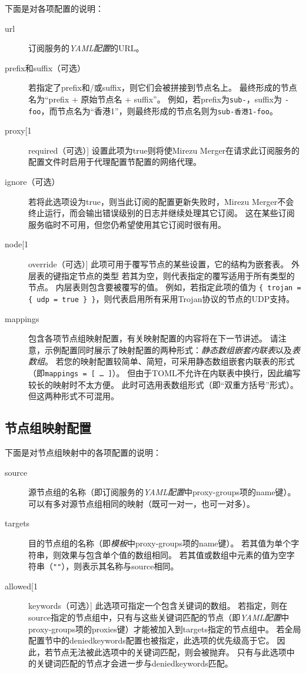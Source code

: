 \documentclass[a4paper,fontset=founder,punct=kaiming]{ctexart}
\renewcommand\_{\textunderscore\linebreak[1]}
\newcommand{\productname}{Mirezu Merger}
\begin{document}
下面是对各项配置的说明：
\begin{description}
\item[url] 订阅服务的\emph{YAML配置}的URL。
\item[prefix和suffix（可选）] 若指定了prefix和/或suffix，则它们会被拼接到节点名上。
  最终形成的节点名为“prefix + 原始节点名 + suffix”。
  例如，若prefix为\texttt{sub-}，suffix为 \texttt{-foo}，而节点名为“香港1”，则最终形成的节点名则为\texttt{sub-香港1-foo}。
\item[proxy\_required（可选）] 设置此项为true则将使\productname 在请求此订阅服务的配置文件时启用于代理配置节配置的网络代理。
\item[ignore（可选）] 若将此选项设为true，则当此订阅的配置更新失败时，\productname 不会终止运行，而会输出错误级别的日志并继续处理其它订阅。
这在某些订阅服务临时不可用，但您仍希望使用其它订阅时很有用。
\item[node\_override（可选）] 此项可用于覆写节点的某些设置，它的结构为嵌套表。
  外层表的键指定节点的类型
  若其为空，则代表指定的覆写适用于所有类型的节点。
  内层表则包含要被覆写的值。
  例如，若指定此项的值为 \Verb|{ trojan = { udp = true } }|，则代表启用所有采用Trojan协议的节点的UDP支持。
\item[mappings] 包含各项节点组映射配置，有关映射配置的内容将在下一节讲述。
  请注意，示例配置同时展示了映射配置的两种形式：\emph{静态数组嵌套内联表}以及\emph{表数组}。
  若您的映射配置较简单、简短，可采用静态数组嵌套内联表的形式（即\texttt{mappings = [ \ldots{} ]}）。
  但由于TOML不允许在内联表中换行，因此编写较长的映射时不太方便。
  此时可选用表数组形式（即“双重方括号”形式）。
  但这两种形式不可混用。
\end{description}

\subsection{节点组映射配置}
\label{sec:groupmap}

下面是对节点组映射中的各项配置的说明：
\begin{description}
\item[source] 源节点组的名称（即订阅服务的\emph{YAML配置}中proxy-groups项的name键）。
  可以有多对源节点组相同的映射（既可一对一，也可一对多）。
\item[targets] 目的节点组的名称（即\emph{模板}中proxy-groups项的name键）。
  若其值为单个字符串，则效果与包含单个值的数组相同。
  若其值或数组中元素的值为空字符串（\Verb|""|），则表示其名称与source相同。
\item[allowed\_keywords（可选）] 此选项可指定一个包含关键词的数组。
  若指定，则在source指定的节点组中，只有与这些关键词匹配的节点（即\emph{YAML配置}中proxy-groups项的proxies键）才能被加入到targets指定的节点组中。
  若全局配置节中的denied\_key\-words配置也被指定，此选项的优先级高于它。
  因此，若节点无法被此选项中的关键词匹配，则会被抛弃。
  只有与此选项中的关键词匹配的节点才会进一步与denied\_key\-words匹配。
\end{description}
\end{document}

